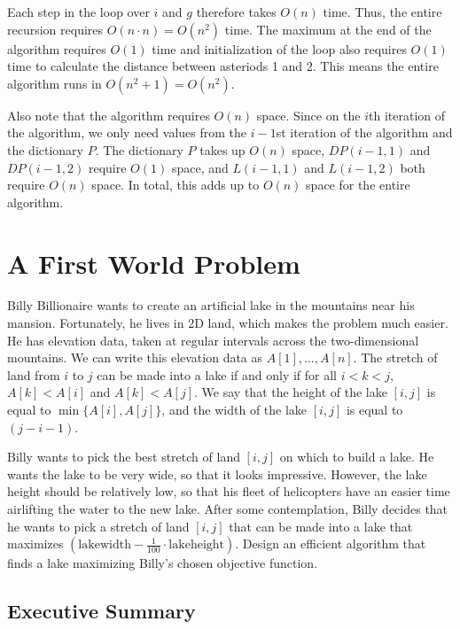 \documentclass{6046}
\begin{document}
Each step in the loop over $i$ and $g$ therefore takes $O(n)$ time. Thus, the entire recursion requires $O(n \cdot n) = O(n^2)$ time. The maximum at the end of the algorithm requires $O(1)$ time and initialization of the loop also requires $O(1)$ time to calculate the distance between asteriods 1 and 2. This means the entire algorithm runs in $O(n^2 + 1) = O(n^2)$. 

Also note that the algorithm requires $O(n)$ space. Since on the $i$th iteration of the algorithm, we only need values from the $i-1$st iteration of the algorithm and the dictionary $P$. The dictionary $P$ takes up $O(n)$ space, $DP(i-1, 1)$ and $DP(i-1,2)$ require $O(1)$ space, and $L(i-1, 1)$ and $L(i-1, 2)$ both require $O(n)$ space. In total, this adds up to $O(n)$ space for the entire algorithm.

\newpage

\section{A First World Problem}

{\em

Billy Billionaire wants to create an artificial lake in the mountains near his
mansion.  Fortunately, he lives in 2D land, which makes the problem much
easier.  He has elevation data, taken at regular intervals across the
two-dimensional mountains.  We can write this elevation data as $A[1], \ldots,
A[n]$.  The stretch of land from $i$ to $j$ can be made into a lake if and only
if for all $i < k < j$, $A[k] < A[i]$ and $A[k] < A[j]$.  We say that the
height of the lake $[i, j]$ is equal to $\min \{ A[i], A[j] \}$, and the width
of the lake $[i, j]$ is equal to $(j - i - 1)$.

Billy wants to pick the best stretch of land $[i, j]$ on which to build a
lake.  He wants the lake to be very wide, so that it looks impressive.
However, the lake height should be relatively low, so that his fleet of
helicopters have an easier time airlifting the water to the new lake.  After
some contemplation, Billy decides that he wants to pick a stretch of land $[i,
j]$ that can be made into a lake that maximizes $(\mathrm{lakewidth} -
\frac{1}{100} \cdot \mathrm{lakeheight})$.  Design an efficient algorithm that
finds a lake maximizing Billy's chosen objective function.

}

\subsection*{Executive Summary}
\end{document}
